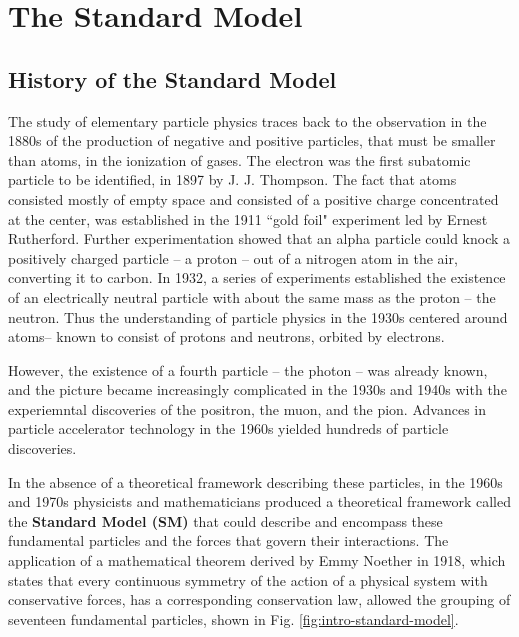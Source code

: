 \documentclass{article}
\begin{document}
\section{The Standard Model}

\subsection{History of the Standard Model}

The study of elementary particle physics traces back to the observation in the 1880s of the production of negative and positive particles, that must be smaller than atoms, in the ionization of gases. The electron was the first subatomic particle to be identified, in 1897 by J. J. Thompson. The fact that atoms consisted mostly of empty space and consisted of a positive charge concentrated at the center, was established in the 1911 ``gold foil" experiment led by Ernest Rutherford. Further experimentation showed that an alpha particle could knock a positively charged particle -- a proton -- out of a nitrogen atom in the air, converting it to carbon. In 1932, a series of experiments established the existence of an electrically neutral particle with about the same mass as the proton -- the neutron. Thus the understanding of particle physics in the 1930s centered around atoms-- known to consist of protons and neutrons, orbited by electrons. 

However, the existence of a fourth particle -- the photon -- was already known, and the picture became increasingly complicated in the 1930s and 1940s with the experiemntal discoveries of the positron, the muon, and the pion. Advances in particle accelerator technology in the 1960s yielded hundreds of particle discoveries. 




In the absence of a theoretical framework describing these particles, in the 1960s and 1970s physicists and mathematicians produced a theoretical framework called the \textbf{Standard Model (SM)} that could describe and encompass these fundamental particles and the forces that govern their interactions. The application of a mathematical theorem derived by Emmy Noether in 1918, which states that every continuous symmetry of the action of a physical system with conservative forces, has a corresponding conservation law, allowed the grouping of seventeen fundamental particles, shown in Fig. \ref{fig:intro-standard-model}.
\end{document}
